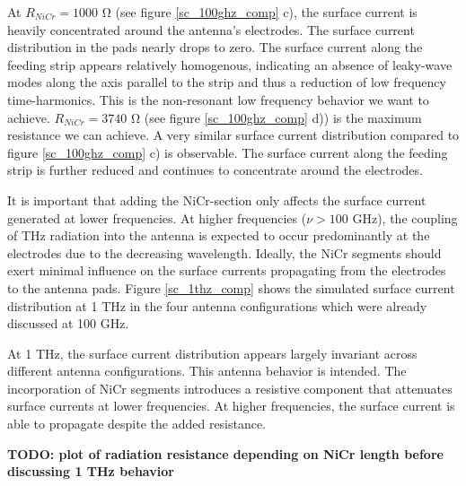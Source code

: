 At $R_{NiCr} = 1000$ \si{\ohm} (see figure \ref{sc_100ghz_comp} c), the surface current is heavily concentrated around the antenna's electrodes. The surface current distribution in the pads nearly drops to zero. The surface current along the feeding strip appears relatively homogenous, indicating an absence of leaky-wave modes along the axis parallel to the strip and thus a reduction of low frequency time-harmonics. This is the non-resonant low frequency behavior we want to achieve. $R_{NiCr} = 3740$ \si{\ohm} (see figure \ref{sc_100ghz_comp} d)) is the maximum resistance we can achieve. A very similar surface current distribution compared to figure \ref{sc_100ghz_comp} c) is observable. The surface current along the feeding strip is further reduced and continues to concentrate around the electrodes. 

It is important that adding the NiCr-section only affects the surface current generated at lower frequencies. At higher frequencies ($\nu > 100$ \si{\giga \hertz}), the coupling of THz radiation into the antenna is expected to occur predominantly at the electrodes due to the decreasing wavelength. Ideally, the NiCr segments should exert minimal influence on the surface currents propagating from the electrodes to the antenna pads. Figure \ref{sc_1thz_comp} shows the simulated surface current distribution at \num{1} \si{\tera \hertz} in the four antenna configurations which were already discussed at \num{100} \si{\giga \hertz}. 

At \num{1} \si{\tera \hertz}, the surface current distribution appears largely invariant across different antenna configurations. This antenna behavior is intended. The incorporation of NiCr segments introduces a resistive component that attenuates surface currents at lower frequencies. At higher frequencies, the surface current is able to propagate despite the added resistance. 

\textbf{TODO: plot of radiation resistance depending on NiCr length before discussing 1 THz behavior}

